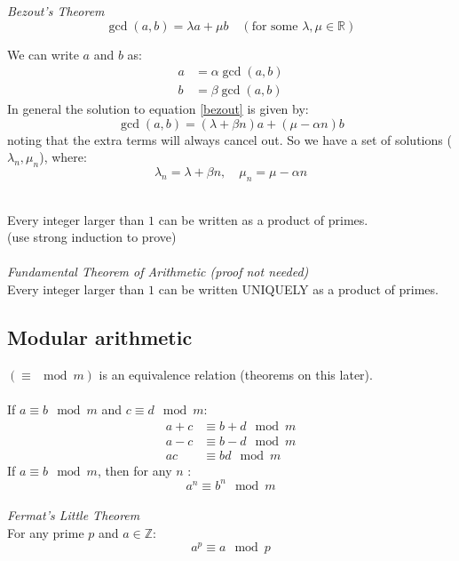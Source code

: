 \documentclass{article}
\newcommand{\R}{\mathbb{R}}
\newcommand{\Z}{\mathbb{Z}}
\begin{document}
\textit{Bezout's Theorem}
\begin{equation} \label{bezout}
\gcd(a, b) = \lambda a + \mu b \quad (\textrm{for some } \lambda, \mu \in \R)
\end{equation}
\begin{tcolorbox}
We can write $ a $ and $ b $ as:
\begin{align}
a & = \alpha \gcd(a, b) \\
b & = \beta \gcd(a, b)
\end{align}
In general the solution to equation \ref{bezout} is given by:
\begin{equation}
\gcd(a, b) = (\lambda + \beta n) a + (\mu - \alpha n) b
\end{equation}
noting that the extra terms will always cancel out. So we have a set of solutions ($ \lambda_{n}, \mu_{n} $), where:
\begin{equation}
\lambda_{n} = \lambda + \beta n, \quad \mu_{n} = \mu - \alpha n
\end{equation}
\end{tcolorbox}
\noindent
\\
Every integer larger than $ 1 $ can be written as a product of primes.
\\
(use strong induction to prove)
\\\\
\textit{Fundamental Theorem of Arithmetic (proof not needed)}
\\
Every integer larger than $ 1 $ can be written UNIQUELY as a product of primes.

\subsection{Modular arithmetic}
$ (\equiv \mod m) $ is an equivalence relation (theorems on this later).
\\\\
If $ a \equiv b \mod m $ and $ c \equiv d \mod m $:
\begin{align}
a + c & \equiv b + d \mod m \\
a - c & \equiv b - d \mod m \\
ac & \equiv bd \mod m
\end{align}
If $ a \equiv b \mod m $, then for any $ n $ :
\begin{equation}
a^{n} \equiv b^{n} \mod m
\end{equation}
\\
\textit{Fermat's Little Theorem}
\\
For any prime $ p $ and $ a \in \Z $:
\begin{equation}
a^{p} \equiv a \mod p
\end{equation}
\end{document}
